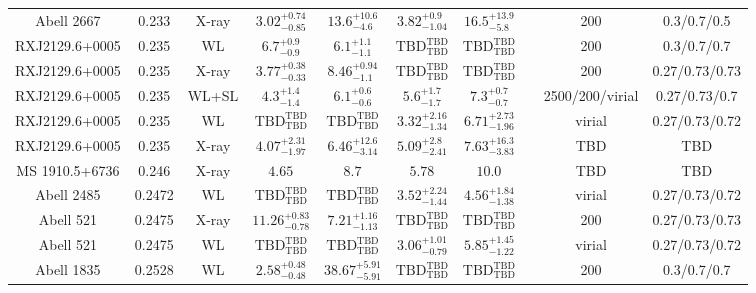 \begin{table}
\begin{tabular}{cccccccccc}
Abell 2667 & 0.233 & X-ray & ${3.02}^{+0.74}_{-0.85}$ & ${13.6}^{+10.6}_{-4.6}$ & ${3.82}^{+0.9}_{-1.04}$ & ${16.5}^{+13.9}_{-5.8}$ & \citet{AL03.1} & 200 & 0.3/0.7/0.5 \\
RXJ2129.6+0005 & 0.235 & WL & ${6.7}^{+0.9}_{-0.9}$ & ${6.1}^{+1.1}_{-1.1}$ & ${\mathrm{TBD}}^{\mathrm{TBD}}_{\mathrm{TBD}}$ & ${\mathrm{TBD}}^{\mathrm{TBD}}_{\mathrm{TBD}}$ & \citet{SE14.1} & 200 & 0.3/0.7/0.7 \\
RXJ2129.6+0005 & 0.235 & X-ray & ${3.77}^{+0.38}_{-0.33}$ & ${8.46}^{+0.94}_{-1.1}$ & ${\mathrm{TBD}}^{\mathrm{TBD}}_{\mathrm{TBD}}$ & ${\mathrm{TBD}}^{\mathrm{TBD}}_{\mathrm{TBD}}$ & \citet{BA14.1} & 200 & 0.27/0.73/0.73 \\
RXJ2129.6+0005 & 0.235 & WL+SL & ${4.3}^{+1.4}_{-1.4}$ & ${6.1}^{+0.6}_{-0.6}$ & ${5.6}^{+1.7}_{-1.7}$ & ${7.3}^{+0.7}_{-0.7}$ & \citet{ME14.1} & 2500/200/virial & 0.27/0.73/0.7 \\
RXJ2129.6+0005 & 0.235 & WL & ${\mathrm{TBD}}^{\mathrm{TBD}}_{\mathrm{TBD}}$ & ${\mathrm{TBD}}^{\mathrm{TBD}}_{\mathrm{TBD}}$ & ${3.32}^{+2.16}_{-1.34}$ & ${6.71}^{+2.73}_{-1.96}$ & \citet{OK10.1} & virial & 0.27/0.73/0.72 \\
RXJ2129.6+0005 & 0.235 & X-ray & ${4.07}^{+2.31}_{-1.97}$ & ${6.46}^{+12.6}_{-3.14}$ & ${5.09}^{+2.8}_{-2.41}$ & ${7.63}^{+16.3}_{-3.83}$ & \citet{SC06.1} & TBD & TBD \\
MS 1910.5+6736 & 0.246 & X-ray & ${4.65}^{}_{}$ & ${8.7}^{}_{}$ & ${5.78}^{}_{}$ & ${10.0}^{}_{}$ & \citet{MO99.1} & TBD & TBD \\
Abell 2485 & 0.2472 & WL & ${\mathrm{TBD}}^{\mathrm{TBD}}_{\mathrm{TBD}}$ & ${\mathrm{TBD}}^{\mathrm{TBD}}_{\mathrm{TBD}}$ & ${3.52}^{+2.24}_{-1.44}$ & ${4.56}^{+1.84}_{-1.38}$ & \citet{OK10.1} & virial & 0.27/0.73/0.72 \\
Abell 521 & 0.2475 & X-ray & ${11.26}^{+0.83}_{-0.78}$ & ${7.21}^{+1.16}_{-1.13}$ & ${\mathrm{TBD}}^{\mathrm{TBD}}_{\mathrm{TBD}}$ & ${\mathrm{TBD}}^{\mathrm{TBD}}_{\mathrm{TBD}}$ & \citet{BA14.1} & 200 & 0.27/0.73/0.73 \\
Abell 521 & 0.2475 & WL & ${\mathrm{TBD}}^{\mathrm{TBD}}_{\mathrm{TBD}}$ & ${\mathrm{TBD}}^{\mathrm{TBD}}_{\mathrm{TBD}}$ & ${3.06}^{+1.01}_{-0.79}$ & ${5.85}^{+1.45}_{-1.22}$ & \citet{OK10.1} & virial & 0.27/0.73/0.72 \\
Abell 1835 & 0.2528 & WL & ${2.58}^{+0.48}_{-0.48}$ & ${38.67}^{+5.91}_{-5.91}$ & ${\mathrm{TBD}}^{\mathrm{TBD}}_{\mathrm{TBD}}$ & ${\mathrm{TBD}}^{\mathrm{TBD}}_{\mathrm{TBD}}$ & \citet{BA07.1} & 200 & 0.3/0.7/0.7 \\

\end{tabular}
\end{table}
